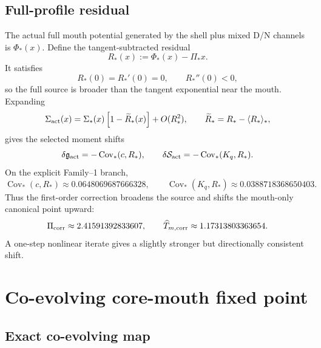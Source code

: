 \subsection{Full-profile residual}
\label{subsec:app-part04-full-profile-residual}

The actual full mouth potential generated by the shell plus mixed D/N channels is \(\Phi_*(x)\).  Define the tangent-subtracted residual
\begin{equation}
\label{eq:app-part04-Rstar-def}
R_*(x):=\Phi_*(x)-\Pi_*x.
\end{equation}
It satisfies
\begin{equation}
\label{eq:app-part04-Rstar-curvature}
R_*(0)=R_*'(0)=0,
\qquad
R_*''(0)<0,
\end{equation}
so the full source is broader than the tangent exponential near the mouth.  Expanding
\begin{equation}
\label{eq:app-part04-Sigma-act}
\Sigma_{\rm act}(x)
=
\Sigma_*(x)\left[1-\widetilde R_*(x)\right]+O(R_*^2),
\qquad
\widetilde R_*=R_*-\langle R_*\rangle_*,
\end{equation}
gives the selected moment shifts
\begin{equation}
\label{eq:app-part04-covariance-shifts}
\delta\mathfrak g_{\rm act}=-\operatorname{Cov}_*(c,R_*),
\qquad
\delta\mathcal S_{\rm act}=-\operatorname{Cov}_*(K_q,R_*).
\end{equation}
On the explicit Family--1 branch,
\begin{equation}
\label{eq:app-part04-actual-mouth-covariances}
\operatorname{Cov}_*(c,R_*)\approx0.0648069687666328,
\qquad
\operatorname{Cov}_*(K_q,R_*)\approx0.0388718368650403.
\end{equation}
Thus the first-order correction broadens the source and shifts the mouth-only canonical point upward:
\begin{equation}
\label{eq:app-part04-mouth-only-corrected-point}
\Pi_{\rm corr}\approx2.41591392833607,
\qquad
\widehat T_{m,{\rm corr}}\approx1.17313803363654.
\end{equation}
A one-step nonlinear iterate gives a slightly stronger but directionally consistent shift.

\section{Co-evolving core-mouth fixed point}
\label{sec:app-part04_geometry_retarded_mouth:co-evolving-core-mouth-fixed-point}

\subsection{Exact co-evolving map}
\label{subsec:app-part04-coevolving-map}

